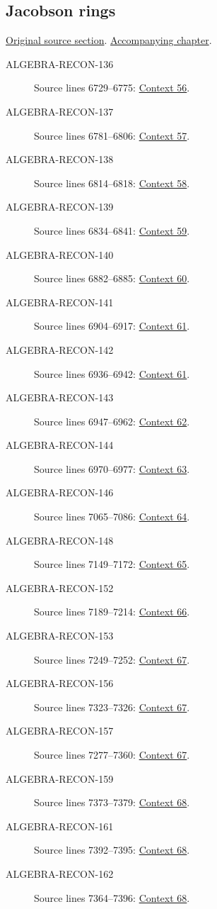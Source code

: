 \subsection{Jacobson rings}
\hypertarget{algebra-source-section-ring-jacobson}{}
\noindent\href{https://github.com/stacks/stacks-project/blob/a04446e57ec1fbc252a871afcec7752fb2807b14/algebra.tex\#L6649}{Original source section}. \href{algebra.pdf\#nameddest=section-ring-jacobson}{Accompanying chapter}.

\begin{description}
\item[ALGEBRA-RECON-136] Source lines 6729--6775: \hyperlink{algebra-context-056}{Context 56}.
\item[ALGEBRA-RECON-137] Source lines 6781--6806: \hyperlink{algebra-context-057}{Context 57}.
\item[ALGEBRA-RECON-138] Source lines 6814--6818: \hyperlink{algebra-context-058}{Context 58}.
\item[ALGEBRA-RECON-139] Source lines 6834--6841: \hyperlink{algebra-context-059}{Context 59}.
\item[ALGEBRA-RECON-140] Source lines 6882--6885: \hyperlink{algebra-context-060}{Context 60}.
\item[ALGEBRA-RECON-141] Source lines 6904--6917: \hyperlink{algebra-context-061}{Context 61}.
\item[ALGEBRA-RECON-142] Source lines 6936--6942: \hyperlink{algebra-context-061}{Context 61}.
\item[ALGEBRA-RECON-143] Source lines 6947--6962: \hyperlink{algebra-context-062}{Context 62}.
\item[ALGEBRA-RECON-144] Source lines 6970--6977: \hyperlink{algebra-context-063}{Context 63}.
\item[ALGEBRA-RECON-146] Source lines 7065--7086: \hyperlink{algebra-context-064}{Context 64}.
\item[ALGEBRA-RECON-148] Source lines 7149--7172: \hyperlink{algebra-context-065}{Context 65}.
\item[ALGEBRA-RECON-152] Source lines 7189--7214: \hyperlink{algebra-context-066}{Context 66}.
\item[ALGEBRA-RECON-153] Source lines 7249--7252: \hyperlink{algebra-context-067}{Context 67}.
\item[ALGEBRA-RECON-156] Source lines 7323--7326: \hyperlink{algebra-context-067}{Context 67}.
\item[ALGEBRA-RECON-157] Source lines 7277--7360: \hyperlink{algebra-context-067}{Context 67}.
\item[ALGEBRA-RECON-159] Source lines 7373--7379: \hyperlink{algebra-context-068}{Context 68}.
\item[ALGEBRA-RECON-161] Source lines 7392--7395: \hyperlink{algebra-context-068}{Context 68}.
\item[ALGEBRA-RECON-162] Source lines 7364--7396: \hyperlink{algebra-context-068}{Context 68}.
\end{description}

